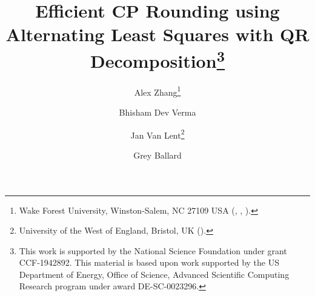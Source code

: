 

\usepackage{lipsum}
\usepackage{amsfonts}
\usepackage{graphicx}
\usepackage{epstopdf}
\ifpdf
\else
\fi

\newcommand{\creflastconjunction}{, and~}





\title{Efficient CP Rounding using Alternating Least Squares with QR Decomposition\thanks{This work is supported by the National Science Foundation under grant CCF-1942892. This material is based upon work supported by the US Department of Energy, Office of Science, Advanced Scientific Computing Research program under award DE-SC-0023296. }}





\author{
  Alex Zhang\thanks{Wake Forest University, Winston-Salem, NC 27109 USA (, , ).} 
  \and Bhisham Dev Verma\footnotemark[2] 
  \and Jan Van Lent\thanks{University of the West of England, Bristol, UK  ().}
 \and Grey Ballard\footnotemark[2]
}


\usepackage{amsopn}
\DeclareMathOperator{\diag}{diag}


